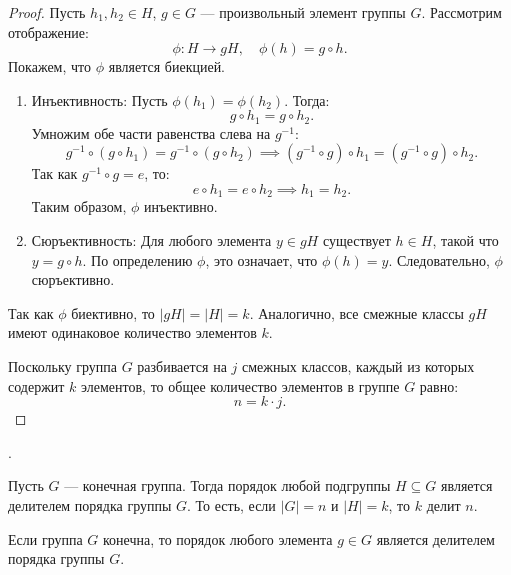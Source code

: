 \begin{proof}
    Пусть \( h_1, h_2 \in H \), \( g \in G \) — произвольный элемент группы \( G \). Рассмотрим отображение:
    \[
    \phi: H \to gH, \quad \phi(h) = g \circ h.
    \]
    Покажем, что \( \phi \) является биекцией.

    \begin{enumerate}
        \item Инъективность:
            Пусть \( \phi(h_1) = \phi(h_2) \). Тогда:
            \[
            g \circ h_1 = g \circ h_2.
            \]
            Умножим обе части равенства слева на \( g^{-1} \):
            \[
            g^{-1} \circ (g \circ h_1) = g^{-1} \circ (g \circ h_2) \implies (g^{-1} \circ g) \circ h_1 = (g^{-1} \circ g) \circ h_2.
            \]
            Так как \( g^{-1} \circ g = e \), то:
            \[
            e \circ h_1 = e \circ h_2 \implies h_1 = h_2.
            \]
            Таким образом, \( \phi \) инъективно.

        \item Сюръективность:
            Для любого элемента \( y \in gH \) существует \( h \in H \), такой что \( y = g \circ h \). По определению \( \phi \), это означает, что \( \phi(h) = y \). Следовательно, \( \phi \) сюръективно.
    \end{enumerate}

    Так как \( \phi \) биективно, то \( |gH| = |H| = k \). Аналогично, все смежные классы \( gH \) имеют одинаковое количество элементов \( k \).

    Поскольку группа \( G \) разбивается на \( j \) смежных классов, каждый из которых \\содержит \( k \) элементов, то общее количество элементов в группе \( G \) равно:
    \[
    n = k \cdot j.
    \]
\end{proof}


\begin{shcor}
    \begin{corollary}.
    \leavevmode \nl 
    
        Пусть \( G \) — конечная группа. Тогда порядок любой подгруппы \( H \subseteq G \) является делителем порядка группы \( G \). То есть, если \( |G| = n \) и \( |H| = k \), то \( k \) делит \( n \).
    \end{corollary}
\end{shcor}


\begin{shcor}
    \begin{corollary}
    \leavevmode \nl 

        Если группа \( G \) конечна, то порядок любого элемента \( g \in G \) является делителем порядка группы \( G \).
    \end{corollary}
\end{shcor}

